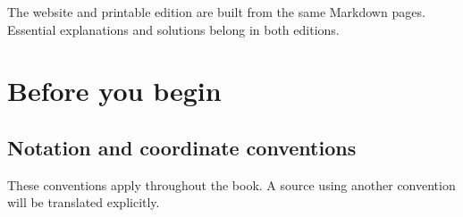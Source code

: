 \documentclass[letterpaper,11pt,english,openany,oneside]{jupyterBook}
\begin{document}
\sphinxAtStartPar
The website and printable edition are built from the same Markdown pages. Essential explanations and solutions belong in both editions.

\sphinxstepscope


\setcounter{secnumdepth}{-1}
\part*{Before you begin}

\sphinxstepscope


\chapter{Notation and coordinate conventions}
\label{\detokenize{foundations/notation:notation-and-coordinate-conventions}}\label{\detokenize{foundations/notation:notation}}\label{\detokenize{foundations/notation::doc}}
\sphinxAtStartPar
These conventions apply throughout the book. A source using another convention will be translated explicitly.
\end{document}

